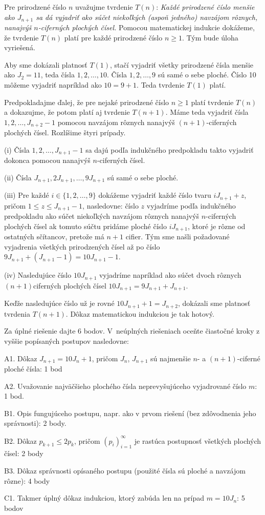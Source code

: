 {\ineriesenie
Pre prirodzené číslo $n$ uvažujme tvrdenie $T(n)$: {\sl Každé prirodzené číslo menšie ako $J_{n+1}$ sa dá vyjadriť ako súčet niekoľkých (aspoň jedného) navzájom rôznych, nanajvýš $n$-ciferných plochých čísel.}
Pomocou matematickej indukcie dokážeme, že tvrdenie $T(n)$ platí pre každé prirodzené číslo $n\ge 1$. Tým bude úloha vyriešená.

Aby sme dokázali platnosť $T(1)$, stačí vyjadriť všetky prirodzené čísla menšie ako $J_2=11$, teda čísla $1,2,\ldots,10$. Čísla $1, 2, \ldots, 9$ sú samé o sebe ploché.
Číslo 10 môžeme vyjadriť napríklad ako $10=9+1$. Teda tvrdenie $T(1)$ platí.

Predpokladajme ďalej, že pre nejaké prirodzené číslo $n\ge 1$ platí tvrdenie $T(n)$ a dokazujme, že potom platí aj tvrdenie $T(n+1)$. Máme teda vyjadriť čísla $1,2,\ldots, {J_{n+2}-1}$ pomocou navzájom rôznych nanajvýš $(n+1)$-ciferných plochých čísel. Rozlíšime štyri prípady.

\smallskip
\item{(i)} Čísla $1, 2, \ldots, J_{n+1} - 1$ sa dajú podľa indukčného predpokladu takto vyjadriť dokonca pomocou nanajvýš $n$-ciferných čísel.
\item{(ii)} Čísla $J_{n+1}, 2J_{n+1}, \ldots, 9J_{n+1}$ sú samé o sebe ploché.
\item{(iii)} Pre každé $i \in \{1, 2, \ldots, 9\}$ dokážeme vyjadriť každé číslo tvaru $iJ_{n+1} + z$, pričom $1 \leq z \leq J_{n+1} - 1$, nasledovne: číslo $z$ vyjadríme podľa indukčného predpokladu ako súčet niekoľkých navzájom rôznych nanajvýš $n$-ciferných plochých čísel ak tomuto súčtu pridáme ploché číslo $iJ_{n+1}$, ktoré je rôzne od ostatných sčítancov, pretože má $n+1$ cifier. Tým sme našli požadované vyjadrenia všetkých prirodzených čísel až po číslo $9J_{n+1} + (J_{n+1} - 1) = 10J_{n+1}-1$.
\item{(iv)} Nasledujúce číslo $10J_{n+1}$ vyjadríme napríklad ako súčet dvoch rôznych $(n+1)$\spojovnik{}ciferných plochých čísel $10J_{n+1}=9J_{n+1}+J_{n+1}$.

\smallskip\noindent
Keďže nasledujúce číslo už je rovné $10J_{n+1}+1=J_{n+2}$, dokázali sme platnosť tvrdenia $T(n+1)$. Dôkaz matematickou indukciou je tak hotový.


\schemaABC
Za úplné riešenie dajte 6 bodov. V~neúplných riešeniach oceňte čiastočné kroky z vyššie popísaných postupov nasledovne:

\smallskip
\item{A1.} Dôkaz $J_{n+1}=10J_n+1$, pričom $J_n$, $J_{n+1}$ sú najmenšie $n$- a $(n+1)$-ciferné ploché čísla: 1 bod
\item{A2.} Uvažovanie najväčšieho plochého čísla neprevyšujúceho vyjadrované číslo $m$: 1 bod.
\item{B1.} Opis fungujúceho postupu, napr. ako v prvom riešení (bez zdôvodnenia jeho správnosti): 2 body.
\item{B2.} Dôkaz $p_{k+1}\le 2p_k$, pričom $(p_i)_{i=1}^\infty$ je rastúca postupnosť všetkých plochých čísel: 2 body
\item{B3.} Dôkaz správnosti opísaného postupu (použité čísla sú ploché a navzájom rôzne): 4 body
\item{C1.} Takmer úplný dôkaz indukciou, ktorý zabúda len na prípad $m=10J_n$: 5 bodov

}
